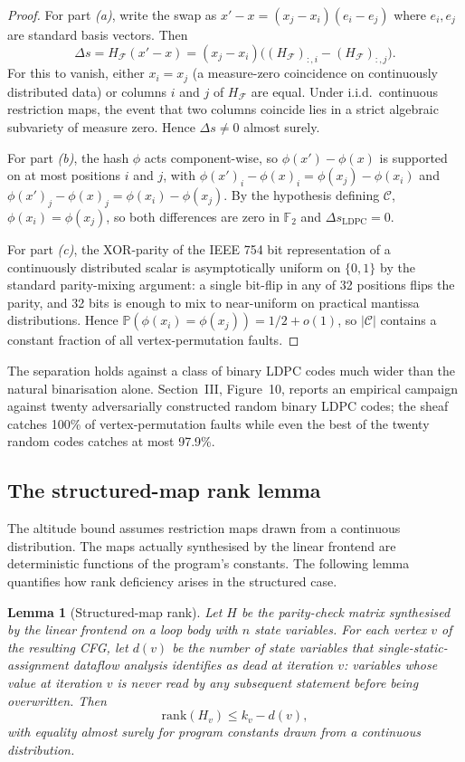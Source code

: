 \documentclass[12pt,a4paper]{article}
\theoremstyle{plain}
\newtheorem{lemma}{Lemma}
\theoremstyle{definition}
\begin{document}
\begin{proof}
For part \textit{(a)}, write the swap as $x' - x = (x_j - x_i)(e_i - e_j)$ where $e_i, e_j$ are standard basis vectors. Then
\[
\Delta s = H_\mathcal{F}(x' - x) = (x_j - x_i)\big((H_\mathcal{F})_{:,i} - (H_\mathcal{F})_{:,j}\big).
\]
For this to vanish, either $x_i = x_j$ (a measure-zero coincidence on continuously distributed data) or columns $i$ and $j$ of $H_\mathcal{F}$ are equal. Under i.i.d.\ continuous restriction maps, the event that two columns coincide lies in a strict algebraic subvariety of measure zero. Hence $\Delta s \neq 0$ almost surely.

For part \textit{(b)}, the hash $\phi$ acts component-wise, so $\phi(x') - \phi(x)$ is supported on at most positions $i$ and $j$, with $\phi(x')_i - \phi(x)_i = \phi(x_j) - \phi(x_i)$ and $\phi(x')_j - \phi(x)_j = \phi(x_i) - \phi(x_j)$. By the hypothesis defining $\mathcal{C}$, $\phi(x_i) = \phi(x_j)$, so both differences are zero in $\mathbb{F}_2$ and $\Delta s_{\mathrm{LDPC}} = 0$.

For part \textit{(c)}, the XOR-parity of the IEEE 754 bit representation of a continuously distributed scalar is asymptotically uniform on $\{0, 1\}$ by the standard parity-mixing argument: a single bit-flip in any of 32 positions flips the parity, and 32 bits is enough to mix to near-uniform on practical mantissa distributions. Hence $\mathbb{P}(\phi(x_i) = \phi(x_j)) = 1/2 + o(1)$, so $|\mathcal{C}|$ contains a constant fraction of all vertex-permutation faults.
\end{proof}

The separation holds against a class of binary LDPC codes much wider than the natural binarisation alone. Section~III, Figure~10, reports an empirical campaign against twenty adversarially constructed random binary LDPC codes; the sheaf catches 100\% of vertex-permutation faults while even the best of the twenty random codes catches at most 97.9\%.

\subsection{The structured-map rank lemma}

The altitude bound assumes restriction maps drawn from a continuous distribution. The maps actually synthesised by the linear frontend are deterministic functions of the program's constants. The following lemma quantifies how rank deficiency arises in the structured case.

\begin{lemma}[Structured-map rank]
\label{lem:rank}
Let $H$ be the parity-check matrix synthesised by the linear frontend on a loop body with $n$ state variables. For each vertex $v$ of the resulting CFG, let $d(v)$ be the number of state variables that single-static-assignment dataflow analysis identifies as dead at iteration $v$: variables whose value at iteration $v$ is never read by any subsequent statement before being overwritten. Then
\[
\mathrm{rank}(H_v) \leq k_v - d(v),
\]
with equality almost surely for program constants drawn from a continuous distribution.
\end{lemma}
\end{document}
